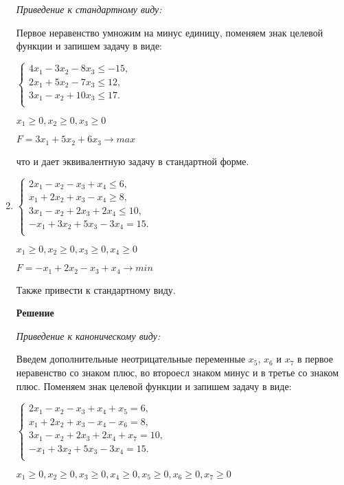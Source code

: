 \documentclass[12pt]{article}
\begin{document}
\begin{enumerate}
\textit{Приведение к стандартному виду:}

Первое неравенство умножим на минус единицу, поменяем знак целевой функции и запишем задачу в виде: 
\begin{center}

$\begin{cases}
  4x_1 -3x_2-8x_3 \le -15,\\ 
 2x_1 +5x_2 -7x_3 \le 12,\\
 3x_1 -x_2 +10x_3\le17.\\
\end{cases}$

$x_1\ge0, x_2\ge0, x_3\ge0$

$F=3x_1+5x_2+ 6x_3 \rightarrow max$\end{center}
что и дает эквивалентную задачу в стандартной форме.
\newpage
\item
\begin{center}
$\begin{cases}
  2x_1 -x_2-x_3+x_4 \le 6,\\ 
 x_1 +2x_2+x_3-x_4 \ge 8,\\
 3x_1 -x_2 +2x_3+2x_4\le10,\\
  -x_1 +3x_2 +5x_3-3x_4=15.\\
\end{cases}$

$x_1\ge0, x_2\ge0, x_3\ge0, x_4\ge0$

$F=-x_1+2x_2- x_3+x_4  \rightarrow min$

Также привести к стандартному виду.
\end{center}

\textbf{Решение}

\textit{Приведение к каноническому виду:}

Введем дополнительные неотрицательные переменные $x_5$, $x_6$ и $ x_7$ в первое неравенство со знаком плюс, во второесл знаком минус и в третье со знаком плюс. Поменяем знак целевой функции и запишем задачу в виде:
\begin{center}
$\begin{cases}
  2x_1 -x_2-x_3+x_4+x_5 = 6,\\ 
 x_1 +2x_2+x_3-x_4 -x_6= 8,\\
 3x_1 -x_2 +2x_3+2x_4+x_7=10,\\
  -x_1 +3x_2 +5x_3-3x_4=15.\\
\end{cases}$

$x_1\ge0, x_2\ge0, x_3\ge0, x_4\ge0, x_5\ge0, x_6\ge0, x_7\ge0$


\end{center}
\end{enumerate}
\end{document}

